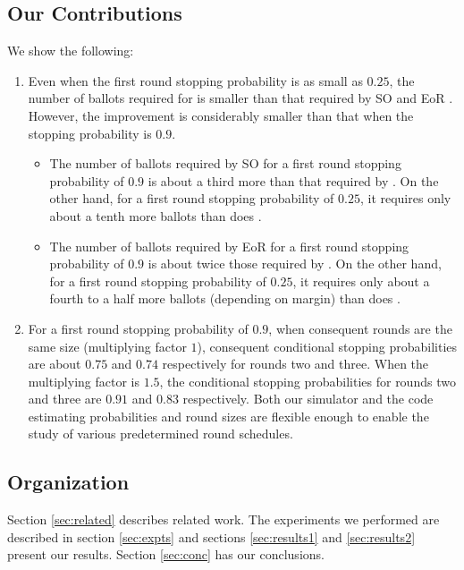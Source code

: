 \subsection{Our Contributions}
We show the following: 
\begin{enumerate}
\item Even when the first round stopping probability is as small as $0.25$, the number of ballots required for \Minerva is smaller than that required by SO \BRAVO and EoR \BRAVO. However, the improvement is considerably smaller than that when the stopping probability is $0.9$. 
\begin{itemize}
\item The number of ballots required by SO \BRAVO for a first round stopping probability of $0.9$ is about a third more than that required by \Minerva. On the other hand, for a first round stopping probability of $0.25$, it requires only about a tenth more ballots than does \Minerva.  
\item The number of ballots required by EoR \BRAVO for a first round stopping probability of $0.9$ is about twice those required by \Minerva. On the other hand, for a first round stopping probability of $0.25$, it requires only about a fourth to a half more ballots (depending on margin) than does \Minerva.  
\end{itemize}
\item For a first round stopping probability of $0.9$, when consequent \Minerva rounds are the same size (multiplying factor $1$), consequent conditional stopping probabilities are about $0.75$ and $0.74$ respectively for rounds two and three. When the multiplying factor is $1.5$, the conditional stopping probabilities for rounds two and three are $0.91$ and $0.83$ respectively. Both our simulator and the code estimating probabilities and round sizes are flexible enough to enable the study of various predetermined round schedules. 
\end{enumerate}

\subsection{Organization} Section \ref{sec:related} describes related work. The experiments we performed are described in section \ref{sec:expts} and sections \ref{sec:results1} and \ref{sec:results2} present our results. Section \ref{sec:conc} has our conclusions. 

